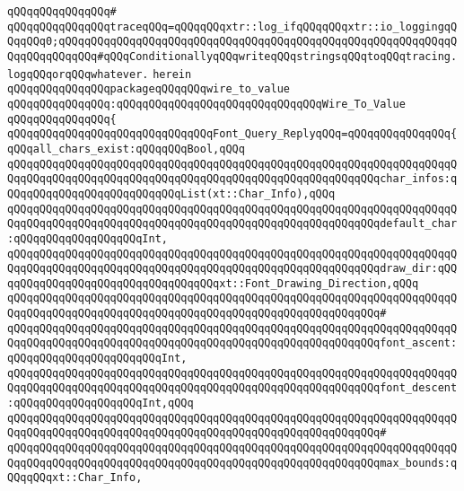\verb|qQQqqQQqqQQqqQQq#|\newline
\verb|qQQqqQQqqQQqqQQqtraceqQQq=qQQqqQQqxtr::log_ifqQQqqQQqxtr::io_loggingqQQqqQQq0;qQQqqQQqqQQqqQQqqQQqqQQqqQQqqQQqqQQqqQQqqQQqqQQqqQQqqQQqqQQqqQQqqQQqqQQqqQQq#qQQqConditionallyqQQqwriteqQQqstringsqQQqtoqQQqtracing.logqQQqorqQQqwhatever.|\newline
\verb|herein|\newline
\newline
\verb|qQQqqQQqqQQqqQQqpackageqQQqqQQqwire_to_value|\newline
\verb|qQQqqQQqqQQqqQQq:qQQqqQQqqQQqqQQqqQQqqQQqqQQqqQQqWire_To_Value|\newline
\verb|qQQqqQQqqQQqqQQq{|\newline
\verb|qQQqqQQqqQQqqQQqqQQqqQQqqQQqqQQqFont_Query_ReplyqQQq=qQQqqQQqqQQqqQQq{qQQqall_chars_exist:qQQqqQQqBool,qQQq|\newline
\verb|qQQqqQQqqQQqqQQqqQQqqQQqqQQqqQQqqQQqqQQqqQQqqQQqqQQqqQQqqQQqqQQqqQQqqQQqqQQqqQQqqQQqqQQqqQQqqQQqqQQqqQQqqQQqqQQqqQQqqQQqqQQqqQQqchar_infos:qQQqqQQqqQQqqQQqqQQqqQQqqQQqList(xt::Char_Info),qQQq|\newline
\verb|qQQqqQQqqQQqqQQqqQQqqQQqqQQqqQQqqQQqqQQqqQQqqQQqqQQqqQQqqQQqqQQqqQQqqQQqqQQqqQQqqQQqqQQqqQQqqQQqqQQqqQQqqQQqqQQqqQQqqQQqqQQqqQQqdefault_char:qQQqqQQqqQQqqQQqqQQqInt,|\newline
\verb|qQQqqQQqqQQqqQQqqQQqqQQqqQQqqQQqqQQqqQQqqQQqqQQqqQQqqQQqqQQqqQQqqQQqqQQqqQQqqQQqqQQqqQQqqQQqqQQqqQQqqQQqqQQqqQQqqQQqqQQqqQQqqQQqdraw_dir:qQQqqQQqqQQqqQQqqQQqqQQqqQQqqQQqqQQqxt::Font_Drawing_Direction,qQQq|\newline
\verb|qQQqqQQqqQQqqQQqqQQqqQQqqQQqqQQqqQQqqQQqqQQqqQQqqQQqqQQqqQQqqQQqqQQqqQQqqQQqqQQqqQQqqQQqqQQqqQQqqQQqqQQqqQQqqQQqqQQqqQQqqQQqqQQq#|\newline
\verb|qQQqqQQqqQQqqQQqqQQqqQQqqQQqqQQqqQQqqQQqqQQqqQQqqQQqqQQqqQQqqQQqqQQqqQQqqQQqqQQqqQQqqQQqqQQqqQQqqQQqqQQqqQQqqQQqqQQqqQQqqQQqqQQqfont_ascent:qQQqqQQqqQQqqQQqqQQqqQQqInt,|\newline
\verb|qQQqqQQqqQQqqQQqqQQqqQQqqQQqqQQqqQQqqQQqqQQqqQQqqQQqqQQqqQQqqQQqqQQqqQQqqQQqqQQqqQQqqQQqqQQqqQQqqQQqqQQqqQQqqQQqqQQqqQQqqQQqqQQqfont_descent:qQQqqQQqqQQqqQQqqQQqInt,qQQq|\newline
\verb|qQQqqQQqqQQqqQQqqQQqqQQqqQQqqQQqqQQqqQQqqQQqqQQqqQQqqQQqqQQqqQQqqQQqqQQqqQQqqQQqqQQqqQQqqQQqqQQqqQQqqQQqqQQqqQQqqQQqqQQqqQQqqQQq#|\newline
\verb|qQQqqQQqqQQqqQQqqQQqqQQqqQQqqQQqqQQqqQQqqQQqqQQqqQQqqQQqqQQqqQQqqQQqqQQqqQQqqQQqqQQqqQQqqQQqqQQqqQQqqQQqqQQqqQQqqQQqqQQqqQQqqQQqmax_bounds:qQQqqQQqxt::Char_Info,|\newline
